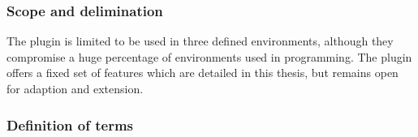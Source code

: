 \subsubsection{Scope and delimination}
The plugin is limited to be used in three defined environments, although they compromise a huge percentage of environments used in programming. The plugin offers a fixed set of features which are detailed in this thesis, but remains open for adaption and extension.
\subsubsection{Definition of terms}

